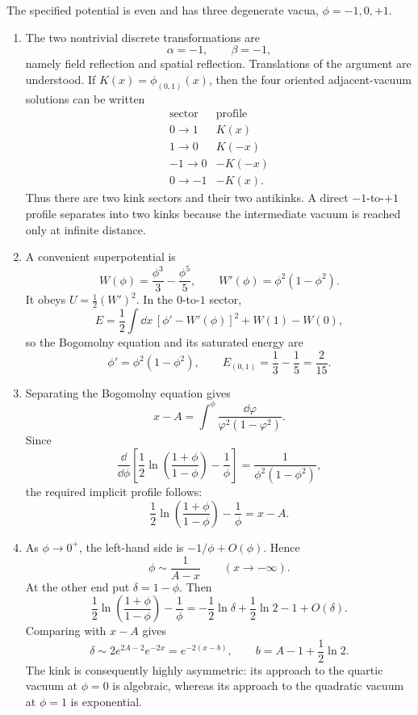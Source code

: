 \begin{enumerate}
  The specified potential is even and has three degenerate vacua,
  \(\phi=-1,0,+1\).
  \begin{enumerate}
    \item[(i)]
    The two nontrivial discrete transformations are
    \[
      \boxed{\alpha=-1,\qquad\beta=-1,}
    \]
    namely field reflection and spatial reflection.  Translations of the
    argument are understood.  If
    \(K(x)=\phi_{(0,1)}(x)\), then the four oriented adjacent-vacuum
    solutions can be written
    \[
    \begin{array}{c|c}
      \text{sector}&\text{profile}\\ \hline
      0\longrightarrow1&K(x)\\
      1\longrightarrow0&K(-x)\\
      -1\longrightarrow0&-K(-x)\\
      0\longrightarrow-1&-K(x).
    \end{array}
    \]
    Thus there are two kink sectors and their two antikinks.  A direct
    \(-1\)-to-\(+1\) profile separates into two kinks because the
    intermediate vacuum is reached only at infinite distance.

    \item[(ii)]
    A convenient superpotential is
    \[
      \boxed{W(\phi)=\frac{\phi^3}{3}-\frac{\phi^5}{5},
      \qquad W'(\phi)=\phi^2(1-\phi^2).}
    \]
    It obeys \(U=\tfrac12(W')^2\).  In the \(0\)-to-\(1\) sector,
    \[
      E=\frac12\int \dd x\,[\phi'-W'(\phi)]^2
        +W(1)-W(0),
    \]
    so the Bogomolny equation and its saturated energy are
    \[
      \boxed{\phi'=\phi^2(1-\phi^2),
      \qquad E_{(0,1)}=\frac13-\frac15=\frac{2}{15}.}
    \]

    \item[(iii)]
    Separating the Bogomolny equation gives
    \[
      x-A=\int^\phi\frac{\dd\varphi}{\varphi^2(1-\varphi^2)}.
    \]
    Since
    \[
      \frac{\dd}{\dd\phi}\left[
        \frac12\ln\left(\frac{1+\phi}{1-\phi}\right)
          -\frac1\phi\right]
        =\frac1{\phi^2(1-\phi^2)},
    \]
    the required implicit profile follows:
    \[
      \boxed{\frac12\ln\left(\frac{1+\phi}{1-\phi}\right)
        -\frac1\phi=x-A.}
    \]

    \item[(iv)]
    As \(\phi\to0^+\), the left-hand side is
    \(-1/\phi+O(\phi)\).  Hence
    \[
      \phi\sim\frac1{A-x}\qquad(x\to-\infty).
    \]
    At the other end put \(\delta=1-\phi\).  Then
    \[
      \frac12\ln\left(\frac{1+\phi}{1-\phi}\right)
        -\frac1\phi
      =-\frac12\ln\delta+\frac12\ln2-1+O(\delta).
    \]
    Comparing with \(x-A\) gives
    \[
      \delta\sim2e^{2A-2}e^{-2x}=e^{-2(x-b)},
      \qquad
      \boxed{b=A-1+\frac12\ln2.}
    \]
    The kink is consequently highly asymmetric: its approach to the
    quartic vacuum at \(\phi=0\) is algebraic, whereas its approach to the
    quadratic vacuum at \(\phi=1\) is exponential.


\end{enumerate}
\end{enumerate}
